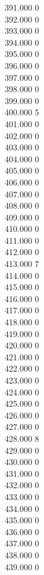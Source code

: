 { 391.000	0 \\
 392.000	0 \\
 393.000	0 \\
 394.000	0 \\
 395.000	0 \\
 396.000	0 \\
 397.000	0 \\
 398.000	0 \\
 399.000	0 \\
 400.000	5 \\
 401.000	0 \\
 402.000	0 \\
 403.000	0 \\
 404.000	0 \\
 405.000	0 \\
 406.000	0 \\
 407.000	0 \\
 408.000	0 \\
 409.000	0 \\
 410.000	0 \\
 411.000	0 \\
 412.000	0 \\
 413.000	7 \\
 414.000	0 \\
 415.000	0 \\
 416.000	0 \\
 417.000	0 \\
 418.000	0 \\
 419.000	0 \\
 420.000	0 \\
 421.000	0 \\
 422.000	0 \\
 423.000	0 \\
 424.000	0 \\
 425.000	0 \\
 426.000	0 \\
 427.000	0 \\
 428.000	8 \\
 429.000	0 \\
 430.000	0 \\
 431.000	0 \\
 432.000	0 \\
 433.000	0 \\
 434.000	0 \\
 435.000	0 \\
 436.000	0 \\
 437.000	0 \\
 438.000	0 \\
 439.000	0 \\
}
